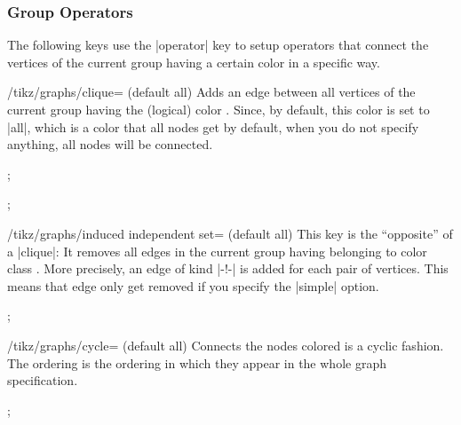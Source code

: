 \subsubsection{Group Operators}

The following keys use the |operator| key to setup operators that connect the
vertices of the current group having a certain color in a specific way.

\begin{key}{/tikz/graphs/clique= (default all)}
    Adds an edge between all vertices of the current group having the (logical)
    color . Since, by default, this color is set to |all|, which is
    a color that all nodes get by default, when you do not specify anything,
    all nodes will be connected.
\begin{codeexample}[]
\tikz {};
\end{codeexample}
\begin{codeexample}[]
\tikz {};
\end{codeexample}
\end{key}

\begin{key}{/tikz/graphs/induced independent set= (default all)}
    This key is the ``opposite'' of a |clique|: It removes all edges in the
    current group having belonging to color class . More precisely,
    an edge of kind |-!-| is added for each pair of vertices. This means that
    edge only get removed if you specify the |simple| option.
\begin{codeexample}[]
\tikz {};
\end{codeexample}
\end{key}

\begin{key}{/tikz/graphs/cycle= (default all)}
    Connects the nodes colored  is a cyclic fashion. The ordering
    is the ordering in which they appear in the whole graph specification.
\begin{codeexample}[]
\tikz {};
\end{codeexample}
\end{key}

